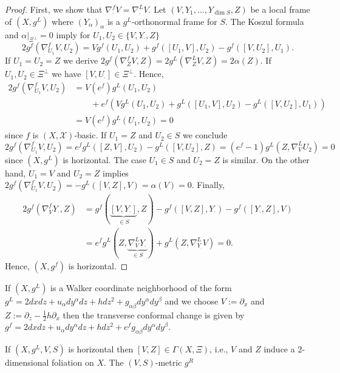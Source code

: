 \documentclass[a4paper,10pt,twoside]{amsart}
\theoremstyle{definition}
\theoremstyle{remark}
\numberwithin{equation}{section}
\begin{document}
\begin{proof}
	First, we show that $\nabla^{f}_{\cdot}{V}=\nabla^{L}_{\cdot}{V}$. Let $(V,Y_{1},\ldots,Y_{\dim S},Z)$ be a local frame of $(X,g^{L})$ where
	$(Y_{\alpha})_{\alpha}$ is a $g^{L}$-orthonormal frame for $S$. The Koszul formula and $\alpha|_{\Xi^{\perp}}=0$ imply for
	$U_{1},U_{2} \in \{V,Y_{\cdot},Z\}$
	\begin{equation*}
		2g^{f}(\nabla^{f}_{U_{1}}{V},U_{2}) = Vg^{f}(U_{1},U_{2}) + g^{f}([U_{1},V],U_{2}) - g^{f}([V,U_{2}],U_{1}).
	\end{equation*}
	If $U_{1}=U_{2}=Z$ we derive $2g^{f}(\nabla^{f}_{Z}V,Z)=2g^{L}(\nabla^{L}_{Z}V,Z)=2\alpha(Z)$. If $U_{1},U_{2} \in \Xi^{\perp}$ we have
	$[V,U_{\cdot}] \in \Xi^{\perp}$. Hence,
	\begin{align*}
		2g^{f}(\nabla^{f}_{U_{1}}{V},U_{2}) &= V(e^{f})g^{L}(U_{1},U_{2})\\
						&\qquad + e^{f}(Vg^{L}(U_{1},U_{2}) + g^{L}([U_{1},V],U_{2}) - g^{L}([V,U_{2}],U_{1}))\\
						&= V(e^{f})g^{L}(U_{1},U_{2}) = 0
	\end{align*}
	since $f$ is $(X,\mathcal{X})$-basic. If $U_{1}=Z$ and $U_{2} \in S$ we conclude
	$2g^{f}(\nabla^{f}_{U_{1}}{V},U_{2})= e^{f}g^{L}([Z,V],U_{2}) -g^{L}([V,U_{2}],Z) = (e^{f}-1)g^{L}(Z,\nabla^{L}_{V}{U_{2}})=0$
	since $(X,g^{L})$ is horizontal. The case $U_{1} \in S$ and $U_{2}=Z$ is similar. On the other hand, $U_{1}=V$ and $U_{2}=Z$ implies
	$2g^{f}(\nabla^{f}_{U_{1}}{V},U_{2})= -g^{L}([V,Z],V)=\alpha(V)=0$. Finally,
	\begin{align*}
		2g^{f}(\nabla^{f}_{V}{Y_{\cdot}},Z) &= g^{f}(\underbrace{[V,Y_{\cdot}]}_{\in S},Z) -g^{f}([V,Z],Y_{\cdot}) -g^{f}([Y_{\cdot},Z],V)\\
				&=e^{f}g^{L}(Z,\underbrace{\nabla^{L}_{V}{Y_{\cdot}}}_{\in S}) +g^{L}(Z,\nabla^{L}_{Y_{\cdot}}{V}) = 0.
	\end{align*}
	Hence, $(X,g^{f})$ is horizontal.
\end{proof}
If $(X,g^{L})$ is a Walker coordinate neighborhood of the form $g^{L}=2dxdz + u_{\alpha}dy^{\alpha}dz + hdz^{2} + g_{\alpha\beta}dy^{\alpha}dy^{\beta}$
and we choose $V:=\partial_{x}$ and $Z:=\partial_{z}-\frac{1}{2}h\partial_{x}$ then the transverse conformal change is given by
$g^{f}=2dxdz + u_{\alpha}dy^{\alpha}dz + hdz^{2}+e^{f}g_{\alpha\beta}dy^{\alpha}dy^{\beta}$.\par
If $(X,g^{L},V,S)$ is horizontal then $[V,Z] \in \Gamma(X,\Xi)$, i.e., $V$ and $Z$ induce a 2-dimensional foliation on $X$. The $(V,S)$-metric $g^{R}$
\end{document}
